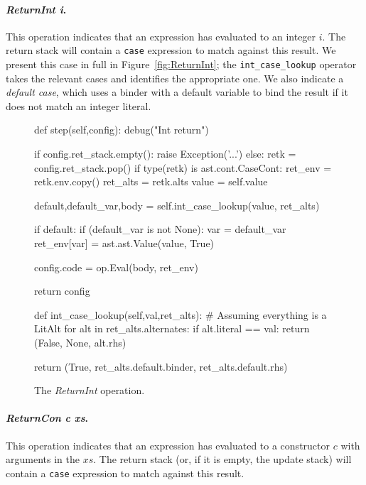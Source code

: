 \documentclass[preprint]{sigplanconf}
\begin{document}
\paragraph{\textit{ReturnInt i}.}
This operation indicates that an expression has evaluated to an integer $i$. The
return stack will contain a \lstinline{case} expression to match against this
result. We present this case in full in Figure~\ref{fig:ReturnInt}; the 
\lstinline{int_case_lookup} operator takes the relevant cases and identifies the
appropriate one. We also indicate a \emph{default case}, which uses a binder
with a default variable to bind the result if it does not match an integer
literal.

\begin{figure}
\begin{code}
def step(self,config):
    debug("Int return")

    if config.ret_stack.empty():
      raise Exception('...')
    else: 
      retk      = config.ret_stack.pop()
      if type(retk) is ast.cont.CaseCont:
        ret_env   = retk.env.copy()
        ret_alts  = retk.alts
        value     = self.value

        default,default_var,body = 
          self.int_case_lookup(value, ret_alts)

        if default:
          if (default_var is not None):
            var = default_var
            ret_env[var] = 
              ast.ast.Value(value, True)

        config.code = op.Eval(body, ret_env)
  
    return config

  def int_case_lookup(self,val,ret_alts):
    # Assuming everything is a LitAlt
    for alt in ret_alts.alternates: 
      if alt.literal == val:
        return (False, None, alt.rhs)

    return (True, 
            ret_alts.default.binder, 
            ret_alts.default.rhs)
\end{code}
\caption{\label{fig:returnint}The \textit{ReturnInt} operation.}
\end{figure}

\paragraph{\textit{ReturnCon c xs}.}
This operation indicates that an expression has evaluated to a constructor $c$
with arguments in the $xs$. The return stack (or, if it is empty, the update
stack) will contain a \lstinline{case} expression to match against this result.
\end{document}
